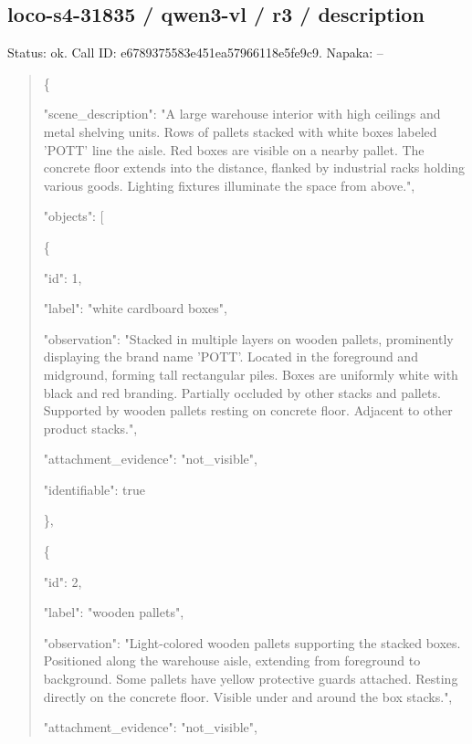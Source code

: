 \documentclass[10pt,a4paper]{article}
\begin{document}
\subsection*{loco-s4-31835 / qwen3-vl / r3 / description}
Status: ok. Call ID: e6789375583e451ea57966118e5fe9c9. Napaka: --
\begin{quote}\footnotesize
\{\par
  "scene\_description":\allowbreak{} "A large warehouse interior with high ceilings and metal shelving units. Rows of pallets stacked with white boxes labeled 'POTT' line the aisle. Red boxes are visible on a nearby pallet. The concrete floor extends into the distance,\allowbreak{} flanked by industrial racks holding various goods. Lighting fixtures illuminate the space from above.",\allowbreak{}\par
  "objects":\allowbreak{} [\par
    \{\par
      "id":\allowbreak{} 1,\allowbreak{}\par
      "label":\allowbreak{} "white cardboard boxes",\allowbreak{}\par
      "observation":\allowbreak{} "Stacked in multiple layers on wooden pallets,\allowbreak{} prominently displaying the brand name 'POTT'. Located in the foreground and midground,\allowbreak{} forming tall rectangular piles. Boxes are uniformly white with black and red branding. Partially occluded by other stacks and pallets. Supported by wooden pallets resting on concrete floor. Adjacent to other product stacks.",\allowbreak{}\par
      "attachment\_evidence":\allowbreak{} "not\_visible",\allowbreak{}\par
      "identifiable":\allowbreak{} true\par
    \},\allowbreak{}\par
    \{\par
      "id":\allowbreak{} 2,\allowbreak{}\par
      "label":\allowbreak{} "wooden pallets",\allowbreak{}\par
      "observation":\allowbreak{} "Light-colored wooden pallets supporting the stacked boxes. Positioned along the warehouse aisle,\allowbreak{} extending from foreground to background. Some pallets have yellow protective guards attached. Resting directly on the concrete floor. Visible under and around the box stacks.",\allowbreak{}\par
      "attachment\_evidence":\allowbreak{} "not\_visible",\allowbreak{}\par

\end{quote}
\end{document}
